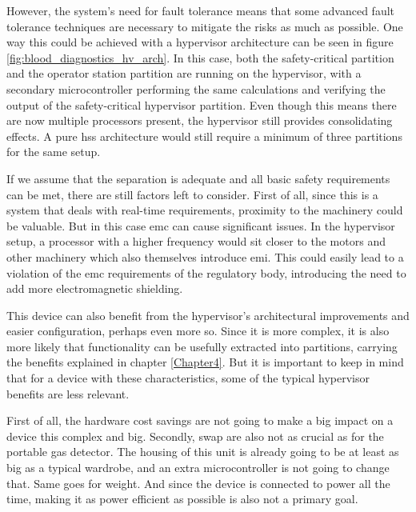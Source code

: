 However, the system's need for fault tolerance means that some advanced fault tolerance techniques are necessary to mitigate the risks as much as possible. One way this could be achieved with a hypervisor architecture can be seen in figure \ref{fig:blood_diagnostics_hv_arch}. In this case, both the safety-critical partition and the operator station partition are running on the hypervisor, with a secondary microcontroller performing the same calculations and verifying the output of the safety-critical hypervisor partition. Even though this means there are now multiple processors present, the hypervisor still provides consolidating effects. A pure \acrshort{hss} architecture would still require a minimum of three partitions for the same setup.

If we assume that the separation is adequate and all basic safety requirements can be met, there are still factors left to consider. First of all, since this is a system that deals with real-time requirements, proximity to the machinery could be valuable. But in this case \acrshort{emc} can cause significant issues. In the hypervisor setup, a processor with a higher frequency would sit closer to the motors and other machinery which also themselves introduce \acrlong{emi}. This could easily lead to a violation of the \acrshort{emc} requirements of the regulatory body, introducing the need to add more electromagnetic shielding. 

This device can also benefit from the hypervisor's architectural improvements and easier configuration, perhaps even more so. Since it is more complex, it is also more likely that functionality can be usefully extracted into partitions, carrying the benefits explained in chapter \ref{Chapter4}. But it is important to keep in mind that for a device with these characteristics, some of the typical hypervisor benefits are less relevant.

First of all, the hardware cost savings are not going to make a big impact on a device this complex and big. Secondly, \acrshort{swap} are also not as crucial as for the portable gas detector. The housing of this unit is already going to be at least as big as a typical wardrobe, and an extra microcontroller is not going to change that. Same goes for weight. And since the device is connected to power all the time, making it as power efficient as possible is also not a primary goal.

